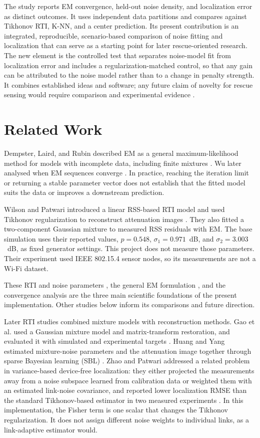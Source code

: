 \documentclass[sensors,article,submit,oneauthor]{Definitions/mdpi}
\begin{document}
The study reports EM convergence, held-out noise density, and localization error as distinct outcomes. It uses independent data partitions and compares against Tikhonov RTI, K-NN, and a center prediction. Its present contribution is an integrated, reproducible, scenario-based comparison of noise fitting and localization that can serve as a starting point for later rescue-oriented research. The new element is the controlled test that separates noise-model fit from localization error and includes a regularization-matched control, so that any gain can be attributed to the noise model rather than to a change in penalty strength. It combines established ideas and software; any future claim of novelty for rescue sensing would require comparison and experimental evidence \cite{Wilson2010,Gao2017,Huang2020,Takeuchi2008}.

\section{Related Work}

Dempster, Laird, and Rubin described EM as a general maximum-likelihood method for models with incomplete data, including finite mixtures \cite{Dempster1977}. Wu later analysed when EM sequences converge \cite{Wu1983}. In practice, reaching the iteration limit or returning a stable parameter vector does not establish that the fitted model suits the data or improves a downstream prediction.

Wilson and Patwari introduced a linear RSS-based RTI model and used Tikhonov regularization to reconstruct attenuation images \cite{Wilson2010}. They also fitted a two-component Gaussian mixture to measured RSS residuals with EM. The base simulation uses their reported values, $p=0.548$, $\sigma_1=0.971$~dB, and $\sigma_2=3.003$~dB, as fixed generator settings. This project does not measure those parameters. Their experiment used IEEE 802.15.4 sensor nodes, so its measurements are not a Wi-Fi dataset.

These RTI and noise parameters \cite{Wilson2010}, the general EM formulation \cite{Dempster1977}, and the convergence analysis \cite{Wu1983} are the three main scientific foundations of the present implementation. Other studies below inform its comparisons and future direction.

Later RTI studies combined mixture models with reconstruction methods. Gao et al. used a Gaussian mixture model and matrix-transform restoration, and evaluated it with simulated and experimental targets \cite{Gao2017}. Huang and Yang estimated mixture-noise parameters and the attenuation image together through sparse Bayesian learning (SBL) \cite{Huang2020}. Zhao and Patwari addressed a related problem in variance-based device-free localization: they either projected the measurements away from a noise subspace learned from calibration data or weighted them with an estimated link-noise covariance, and reported lower localization RMSE than the standard Tikhonov-based estimator in two measured experiments \cite{Zhao2011}. In this implementation, the Fisher term is one scalar that changes the Tikhonov regularization. It does not assign different noise weights to individual links, as a link-adaptive estimator would.
\end{document}
